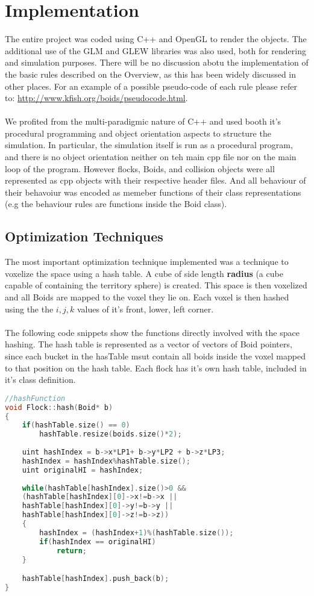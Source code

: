 \documentclass[12pt]{article}
\begin{document}
\section{Implementation}
The entire project was coded using C++ and OpenGL to render the objects. The additional use of the GLM and GLEW libraries was also used, both for rendering and simulation purposes. There will be no discussion abotu the implementation of the basic rules described on the Overview, as this has been widely discussed in other places. For an example of a possible pseudo-code of each rule please refer to: \url{http://www.kfish.org/boids/pseudocode.html}.
\\ \\
We profited from the multi-paradigmic nature of C++ and used booth it's procedural programming and object orientation aspects to structure the simulation. In particular, the simulation itself is run as a procedural program, and there is no object orientation neither on teh main cpp file nor on the main loop of the program. However flocks, Boids, and collision objects were all represented as cpp objects with their respective header files. And all behaviour of their behavoiur was encoded as memeber functions of their class representations (e.g the behaviour rules are functions inside the Boid class). 

\subsection{Optimization Techniques}
The most important optimization technique implemented was a technique to voxelize the space using a hash table. A cube of side length \textbf{radius} (a cube capable of containing the territory sphere) is created. This space is then voxelized and all Boids are mapped to the voxel they lie on. Each voxel is then hashed using the the $i,j,k$ values of it's front, lower, left corner.
\\ \\
\noindent The following code snippets show the functions directly involved with the space hashing. The hash table is represented as a vector of vectors of Boid pointers, since each bucket in the hasTable msut contain all boids inside the voxel mapped to that position on the hash table. Each flock has it's own hash table, included in it's class definition.

\begin{minipage}[t]{\textwidth}
\begin{lstlisting}[language=C++]
//hashFunction
void Flock::hash(Boid* b)
{
	if(hashTable.size() == 0)
		hashTable.resize(boids.size()*2);
	
	uint hashIndex = b->x*LP1+ b->y*LP2 + b->z*LP3;
	hashIndex = hashIndex%hashTable.size();
	uint originalHI = hashIndex;
	
	while(hashTable[hashIndex].size()>0 &&
	(hashTable[hashIndex][0]->x!=b->x ||
	hashTable[hashIndex][0]->y!=b->y ||
	hashTable[hashIndex][0]->z!=b->z))
	{
		hashIndex = (hashIndex+1)%(hashTable.size());
		if(hashIndex == originalHI)
			return;
	}

	hashTable[hashIndex].push_back(b);
}
\end{lstlisting}
\end{minipage}
\end{document}
